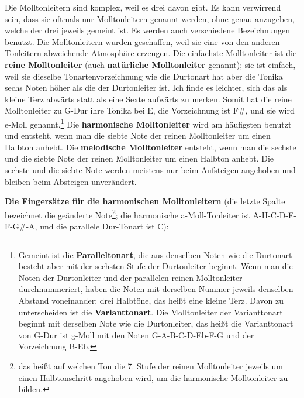 Die Molltonleitern sind komplex, weil es drei davon gibt.
Es kann verwirrend sein, dass sie oftmals nur Molltonleitern genannt werden, ohne genau anzugeben, welche der drei jeweils gemeint ist.
Es werden auch verschiedene Bezeichnungen benutzt.
Die Molltonleitern wurden geschaffen, weil sie eine von den anderen Tonleitern abweichende Atmosphäre erzeugen.
Die einfachste Molltonleiter ist die \textbf{reine Molltonleiter} (auch \textbf{natürliche Molltonleiter} genannt); sie ist einfach, weil sie dieselbe Tonartenvorzeichnung wie die Durtonart hat aber die Tonika sechs Noten höher als die der Durtonleiter ist.
Ich finde es leichter, sich das als kleine Terz abwärts statt als eine Sexte aufwärts zu merken. 
Somit hat die reine Molltonleiter zu G-Dur ihre Tonika bei E, die Vorzeichnung ist F\#, und sie wird e-Moll genannt.\footnote{Gemeint ist die \textbf{Paralleltonart}, die aus denselben Noten wie die Durtonart besteht aber mit der sechsten Stufe der Durtonleiter beginnt. Wenn man die Noten der Durtonleiter und der parallelen reinen Molltonleiter durchnummeriert, haben die Noten mit derselben Nummer jeweils denselben Abstand voneinander: drei Halbtöne, das heißt eine kleine Terz. Davon zu unterscheiden ist die \textbf{Varianttonart}. Die Molltonleiter der Varianttonart beginnt mit derselben Note wie die Durtonleiter, das heißt die Varianttonart von G-Dur ist g-Moll mit den Noten G-A-B-C-D-Eb-F-G und der Vorzeichnung B-Eb.}
Die \textbf{harmonische  Molltonleiter} wird am häufigsten benutzt und entsteht, wenn man die siebte Note der reinen Molltonleiter um einen Halbton anhebt.
Die \textbf{melodische  Molltonleiter} entsteht, wenn man die sechste und die siebte Note der reinen Molltonleiter um einen Halbton anhebt.
Die sechste und die siebte Note werden meistens nur beim Aufsteigen angehoben und bleiben beim Absteigen unverändert.

\textbf{Die Fingersätze für die harmonischen Molltonleitern} (die letzte Spalte bezeichnet die geänderte Note\footnote{das heißt auf welchen Ton die 7. Stufe der reinen Molltonleiter jeweils um einen Halbtonschritt angehoben wird, um die harmonische Molltonleiter zu bilden.}; die harmonische a-Moll-Tonleiter ist A-H-C-D-E-F-G\#-A, und die parallele Dur-Tonart ist C):


